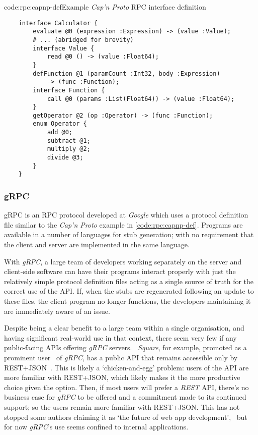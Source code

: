 \begin{codelisting}{code:rpc:capnp-def}{Example \emph{Cap'n Proto} RPC interface definition~\cite{capnp_example}}
\begin{spacing}{1.0}
\begin{verbatim}
    interface Calculator {
        evaluate @0 (expression :Expression) -> (value :Value);
        # ... (abridged for brevity)
        interface Value {
            read @0 () -> (value :Float64);
        }
        defFunction @1 (paramCount :Int32, body :Expression)
            -> (func :Function);
        interface Function {
            call @0 (params :List(Float64)) -> (value :Float64);
        }
        getOperator @2 (op :Operator) -> (func :Function);
        enum Operator {
            add @0;
            subtract @1;
            multiply @2;
            divide @3;
        }
    }
\end{verbatim}
\end{spacing}
\end{codelisting}

\subsubsection{gRPC} \label{soln:rpc:grpc}

gRPC is an RPC protocol developed at \emph{Google} which uses a protocol definition file similar to the \emph{Cap'n Proto} example in \cref{code:rpc:capnp-def}. Programs are available in a number of languages for stub generation; with no requirement that the client and server are implemented in the same language.~\cite{grpc}

With \emph{gRPC}, a large team of developers working separately on the server and client-side software can have their programs interact properly with just the relatively simple protocol definition files acting as a single source of truth for the correct use of the API. If, when the stubs are regenerated following an update to these files, the client program no longer functions, the developers maintaining it are immediately aware of an issue.

Despite being a clear benefit to a large team within a single organisation, and having significant real-world use in that context, there seem very few if any public-facing APIs offering \emph{gRPC} servers.~\cite{grpc} \emph{Square}, for example, promoted as a prominent user~\cite{square_grpc} of \emph{gRPC}, has a public API that remains accessible only by REST+JSON~\cite{square_api}. This is likely a `chicken-and-egg' problem: users of the API are more familiar with REST+JSON, which likely makes it the more productive  choice given the option. Then, if most users will prefer a \emph{REST} API, there's no business case for \emph{gRPC} to be offered and a commitment made to its continued support; so the users remain more familiar with REST+JSON. This has not stopped some authors claiming it as `the future of web app development',~\cite{grpc_web1, grpc_web2} but for now \emph{gRPC}'s use seems confined to internal applications.